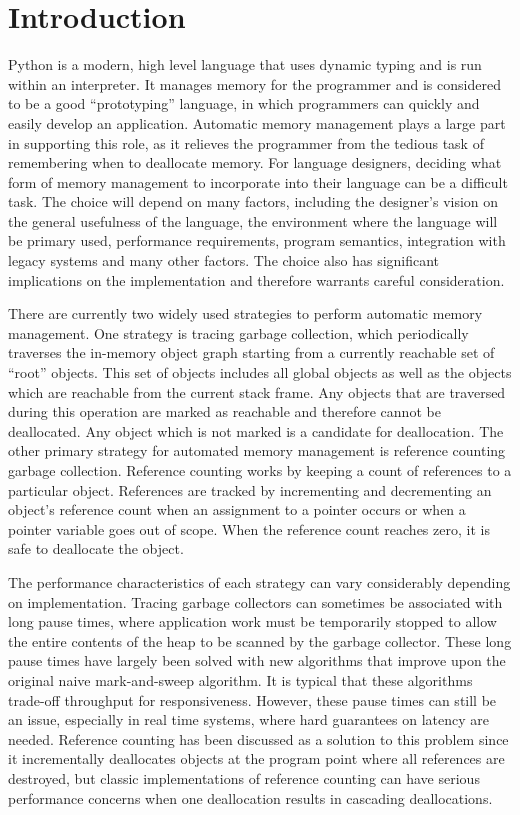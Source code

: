 \documentclass{sigplanconf}
\begin{document}
\section{Introduction}

Python is a modern, high level language that uses dynamic typing and is run within an interpreter.  It manages memory for the programmer and is considered to be a good ``prototyping'' language, in which programmers can quickly and easily develop an application.   Automatic memory management plays a large part in supporting this role, as it relieves the programmer from the tedious task of remembering when to deallocate memory.  For language designers, deciding what form of memory management to incorporate into their language can be a difficult task.  The choice will depend on many factors, including the designer's vision on the general usefulness of the language, the environment where the language will be primary used, performance requirements, program semantics, integration with legacy systems and many other factors.  The choice also has significant implications on the implementation and therefore warrants careful consideration.  

There are currently two widely used strategies to perform automatic memory management.  One strategy is tracing garbage collection, which periodically traverses the in-memory object graph starting from a currently reachable set of ``root'' objects.  This set of objects includes all global objects as well as the objects which are reachable from the current stack frame.  Any objects that are traversed during this operation are marked as reachable and therefore cannot be deallocated.  Any object which is not marked is a candidate for deallocation.  The other primary strategy for automated memory management is reference counting garbage collection. Reference counting works by keeping a count of references to a particular object.  References are tracked by incrementing and decrementing an object's reference count when an assignment to a pointer occurs or when a pointer variable goes out of scope.  When the reference count reaches zero, it is safe to deallocate the object.

The performance characteristics of each strategy can vary considerably depending on implementation.   Tracing garbage collectors can sometimes be associated with long pause times, where application work must be temporarily stopped to allow the entire contents of the heap to be scanned by the garbage collector.  These long pause times have largely been solved with new algorithms that improve upon the original naive mark-and-sweep algorithm.  It is typical that these algorithms trade-off throughput for responsiveness.  However, these pause times can still be an issue, especially in real time systems, where hard guarantees on latency are needed.  Reference counting has been discussed as a solution to this problem since it incrementally deallocates objects at the program point where all references are destroyed, but classic implementations of reference counting can have serious performance concerns when one deallocation results in cascading deallocations\cite{boehm}.  
\end{document}
